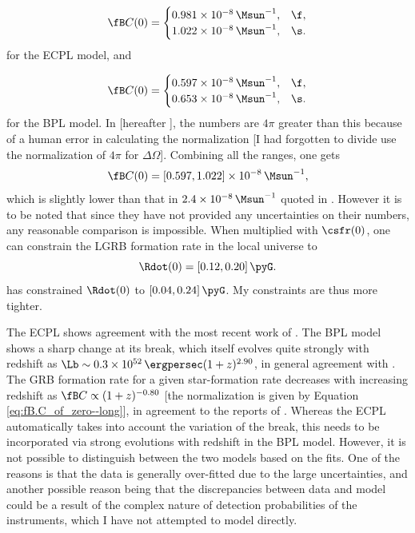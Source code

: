 \begin{equation}
\fB C(0) = \begin{cases}
0.981 \times 10^{-8} \, \Msun^{-1}, & \f,\\
1.022 \times 10^{-8} \, \Msun^{-1}, & \s.
\end{cases}
\label{eq:fB.C_of_zero_ECPL--long}
\end{equation} for the ECPL model, and

\begin{equation}
\fB C(0) = \begin{cases}
0.597 \times 10^{-8} \, \Msun^{-1}, & \f,\\
0.653 \times 10^{-8} \, \Msun^{-1}, & \s.
\end{cases}
\label{eq:fB.C_of_zero_BPL--long}
\end{equation} for the BPL model. In \cite{Paul-2018-MNRAS--long} [hereafter ], the numbers are $4 \pi$ greater than this because of a human error in calculating the normalization [I had forgotten to divide use the normalization of $4 \pi$ for $\Delta \Omega$]. Combining all the ranges, one gets
\begin{equation}
\fB C(0) = [0.597, 1.022] \times 10^{-8} \, \Msun^{-1},
\label{eq:fB.C_of_zero--long}
\end{equation} which is slightly lower than that in $2.4 \times 10^{-8} \, \Msun^{-1}$ quoted in . However it is to be noted that since they have not provided any uncertainties on their numbers, any reasonable comparison is impossible. When multiplied with $\csfr(0)$, one can constrain the LGRB formation rate in the local universe to
\begin{equation}
\Rdot(0) = [0.12, 0.20] \, \pyG.
\label{eq:Rdot0--long}
\end{equation}  has constrained $\Rdot(0)$ to $[0.04, 0.24] \, \pyG$. My constraints are thus more tighter.

The ECPL shows agreement with the most recent work of . The BPL model shows a sharp change at its break, which itself evolves quite strongly with redshift as $\Lb \sim 0.3 \times 10^{52} \, \ergpersec (1+z)^{2.90}$, in general agreement with . The GRB formation rate for a given star-formation rate decreases with increasing redshift as $\fB C \propto (1+z)^{-0.80}$ [the normalization is given by Equation \ref{eq:fB.C_of_zero--long}], in agreement to the reports of . Whereas the ECPL automatically takes into account the variation of the break, this needs to be incorporated via  strong evolutions with redshift in the BPL model. However, it is not possible to distinguish between the two models based on the fits. One of the reasons is that the data is generally over-fitted due to the large uncertainties, and another possible reason being that the discrepancies between data and model could be a result of the complex nature of detection probabilities of the instruments, which I have not attempted to model directly.

